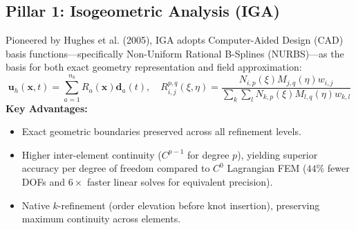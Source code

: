 \documentclass[11pt,a4paper]{article}
\newcommand{\vect}[1]{\mathbf{#1}}
\begin{document}
\subsection{Pillar 1: Isogeometric Analysis (IGA)}
Pioneered by Hughes et al. (2005), IGA adopts Computer-Aided Design (CAD) basis functions---specifically Non-Uniform Rational B-Splines (NURBS)---as the basis for both exact geometry representation and field approximation:
\begin{equation}
    \vect{u}_h(\vect{x}, t) = \sum_{a=1}^{n_b} R_a(\vect{x}) \vect{d}_a(t), \quad R_{i,j}^{p,q}(\xi, \eta) = \frac{N_{i,p}(\xi) M_{j,q}(\eta) w_{i,j}}{\sum_{k} \sum_{l} N_{k,p}(\xi) M_{l,q}(\eta) w_{k,l}}
\end{equation}
\textbf{Key Advantages:}
\begin{itemize}[noitemsep, leftmargin=*]
    \item Exact geometric boundaries preserved across all refinement levels.
    \item Higher inter-element continuity ($C^{p-1}$ for degree $p$), yielding superior accuracy per degree of freedom compared to $C^0$ Lagrangian FEM ($44\%$ fewer DOFs and $6\times$ faster linear solves for equivalent precision).
    \item Native $k$-refinement (order elevation before knot insertion), preserving maximum continuity across elements.
\end{itemize}
\end{document}
